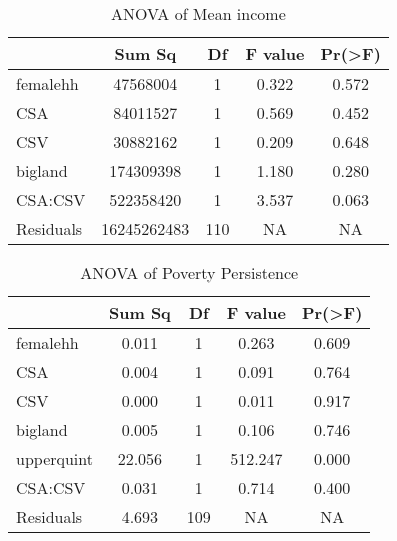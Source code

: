 \documentclass[
]{article}
\begin{document}
\begin{table}

\caption{\label{tab:printtables}ANOVA of Mean income}
\centering
\begin{tabular}[t]{lcccc}
\toprule
  & Sum Sq & Df & F value & Pr(>F)\\
\midrule
femalehh & 47568004 & 1 & 0.322 & 0.572\\
 
CSA & 84011527 & 1 & 0.569 & 0.452\\
 
CSV & 30882162 & 1 & 0.209 & 0.648\\
 
bigland & 174309398 & 1 & 1.180 & 0.280\\
 
CSA:CSV & 522358420 & 1 & 3.537 & 0.063\\
 
Residuals & 16245262483 & 110 & NA & NA\\
\bottomrule
\end{tabular}
\end{table}

\begin{table}

\caption{\label{tab:printtables}ANOVA of Poverty Persistence}
\centering
\begin{tabular}[t]{lcccc}
\toprule
  & Sum Sq & Df & F value & Pr(>F)\\
\midrule
femalehh & 0.011 & 1 & 0.263 & 0.609\\
 
CSA & 0.004 & 1 & 0.091 & 0.764\\
 
CSV & 0.000 & 1 & 0.011 & 0.917\\
 
bigland & 0.005 & 1 & 0.106 & 0.746\\
 
upperquint & 22.056 & 1 & 512.247 & 0.000\\
 
CSA:CSV & 0.031 & 1 & 0.714 & 0.400\\
 
Residuals & 4.693 & 109 & NA & NA\\
\bottomrule
\end{tabular}
\end{table}
\end{document}
